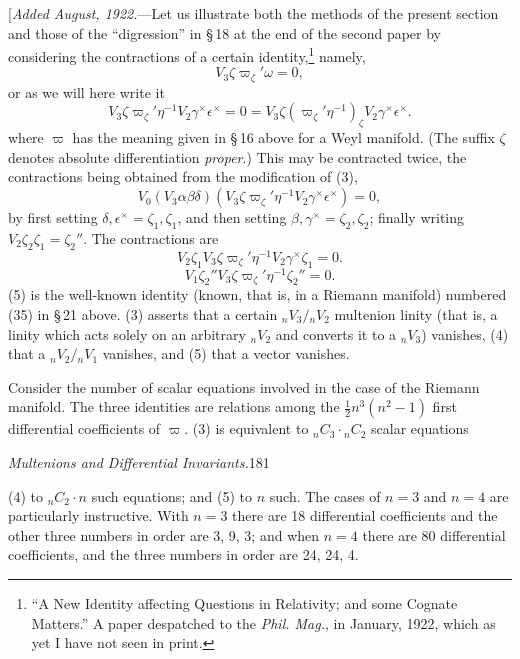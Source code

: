 \documentclass[11pt]{article}
\begin{document}
\indent [\emph{Added August, 1922.}---Let us illustrate both the methods of the present section and those of the ``digression'' in \S\,18 at the end of the second paper by considering the contractions of a certain identity,\footnote{``A New Identity affecting Questions in Relativity; and some Cognate Matters.'' A paper despatched to the \emph{Phil. Mag.}, in January, 1922, which as yet I have not seen in print.} namely,
\[
  V_3\zeta\varpi_\zeta'\omega=0,
  \tag{2}
\]
or as we will here write it
\[
  V_3\zeta\varpi_\zeta'\eta^{-1}V_2\gamma^\times\epsilon^\times=0=V_3\zeta(\varpi_\zeta'\eta^{-1})_\zeta V_2\gamma^\times\epsilon^\times.
  \tag{3}
\]
where $\varpi$ has the meaning given in \S\,16 above for a Weyl manifold. (The suffix $\zeta$ denotes absolute differentiation \emph{proper}.) This may be contracted twice, the contractions being obtained from the modification of (3),
\[
  V_0(V_3\alpha\beta\delta)(V_3\zeta\varpi_\zeta'\eta^{-1}V_2\gamma^\times\epsilon^\times)=0,
  \tag{3a}
\]
by first setting $\delta,\epsilon^\times=\zeta_1,\zeta_1$, and then setting $\beta,\gamma^\times=\zeta_2,\zeta_2$; finally writing $V_2\zeta_2\zeta_1=\zeta_2''$. The contractions are
\[
  V_2\zeta_1V_3\zeta\varpi_\zeta'\eta^{-1}V_2\gamma^\times\zeta_1=0.
  \tag{4}
\]
\[
  V_1\zeta_2''V_3\zeta\varpi_\zeta'\eta^{-1}\zeta_2''=0.
  \tag{5}
\]
(5) is the well-known identity (known, that is, in a Riemann manifold) numbered (35) in \S\,21 above. (3) asserts that a certain ${}_nV_3/{}_nV_2$ multenion linity (that is, a linity which acts solely on an arbitrary ${}_nV_2$ and converts it to a ${}_nV_3$) vanishes, (4) that a ${}_nV_2/{}_nV_1$ vanishes, and (5) that a vector vanishes.

\indent Consider the number of scalar equations involved in the case of the Riemann manifold. The three identities are relations among the $\tfrac12n^3(n^2-1)$ first differential coefficients of $\varpi$. (3) is equivalent to ${}_nC_3\mathbin{\cdot}{}_nC_2$ scalar equations

\newpage\thispagestyle{empty}\begin{center}\textit{Multenions and Differential Invariants.}\hfill 181\end{center}
(4) to ${}_nC_2\mathbin{\cdot}n$ such equations; and (5) to $n$ such. The cases of $n=3$ and $n=4$ are particularly instructive. With $n=3$ there are 18 differential coefficients and the other three numbers in order are 3, 9, 3; and when $n=4$ there are 80 differential coefficients, and the three numbers in order are 24, 24, 4.
\end{document}
